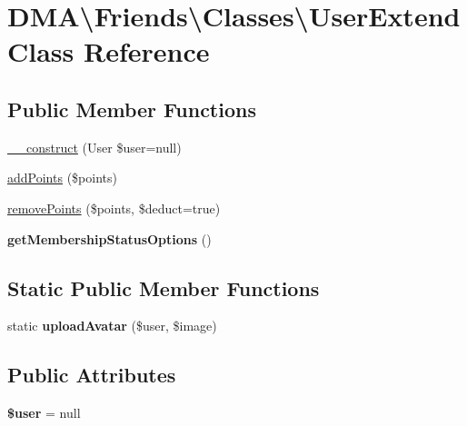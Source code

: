 \hypertarget{classDMA_1_1Friends_1_1Classes_1_1UserExtend}{}\section{D\+M\+A\textbackslash{}Friends\textbackslash{}Classes\textbackslash{}User\+Extend Class Reference}
\label{classDMA_1_1Friends_1_1Classes_1_1UserExtend}
\subsection*{Public Member Functions}
\begin{DoxyCompactItemize}
\item 
\hyperlink{classDMA_1_1Friends_1_1Classes_1_1UserExtend_aa399d503ccb972cb46171bd7cc2fbadf}{\+\_\+\+\_\+construct} (User \$user=null)
\item 
\hyperlink{classDMA_1_1Friends_1_1Classes_1_1UserExtend_ae2d0cddf99425d8ffbe2ed2c74372024}{add\+Points} (\$points)
\item 
\hyperlink{classDMA_1_1Friends_1_1Classes_1_1UserExtend_a72299c6e170b749617a262f18a8d7d67}{remove\+Points} (\$points, \$deduct=true)
\item 
\hypertarget{classDMA_1_1Friends_1_1Classes_1_1UserExtend_ac1de8e9326eaa1466503bf34fa0a3748}{}{\bfseries get\+Membership\+Status\+Options} ()\label{classDMA_1_1Friends_1_1Classes_1_1UserExtend_ac1de8e9326eaa1466503bf34fa0a3748}

\end{DoxyCompactItemize}
\subsection*{Static Public Member Functions}
\begin{DoxyCompactItemize}
\item 
\hypertarget{classDMA_1_1Friends_1_1Classes_1_1UserExtend_a0052edba29ca35647646bd33a05d9ccf}{}static {\bfseries upload\+Avatar} (\$user, \$image)\label{classDMA_1_1Friends_1_1Classes_1_1UserExtend_a0052edba29ca35647646bd33a05d9ccf}

\end{DoxyCompactItemize}
\subsection*{Public Attributes}
\begin{DoxyCompactItemize}
\item 
\hypertarget{classDMA_1_1Friends_1_1Classes_1_1UserExtend_ab5502f589b8c00f7a847a3ebece55281}{}{\bfseries \$user} = null\label{classDMA_1_1Friends_1_1Classes_1_1UserExtend_ab5502f589b8c00f7a847a3ebece55281}

\end{DoxyCompactItemize}


